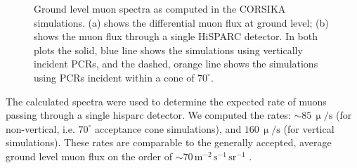 \begin{figure}[ht!]
	\centering
	\qquad
	\caption{Ground level muon spectra as computed in the CORSIKA simulations. (a) shows the differential muon flux at ground level; (b) shows the muon flux through a single HiSPARC detector. In both plots the solid, blue line shows the simulations using vertically incident PCRs, and the dashed, orange line shows the simulations using PCRs incident within a cone of $70^{\circ}$.}
	\label{fig:CORSIKA_muon_spectra}
\end{figure}



The calculated spectra were used to determine the expected rate of muons passing through a single \gls{hisparc} detector. We computed the rates: $\sim 85 \, \upmu/\mathrm{s}$ (for non-vertical, i.e. $70^\circ$ acceptance cone simulations), and $160 \, \upmu/\mathrm{s}$ (for vertical simulations). These rates are comparable to the generally accepted, average ground level muon flux on the order of $\sim 70 \, \mathrm{m}^{-2}\,\mathrm{s}^{-1}\,\mathrm{sr}^{-1}$ \citep{cecchini_cosmic_2000, blackmore_terrestrial_2015, pereira_ground_2020, particle_data_group_review_2020}. %

